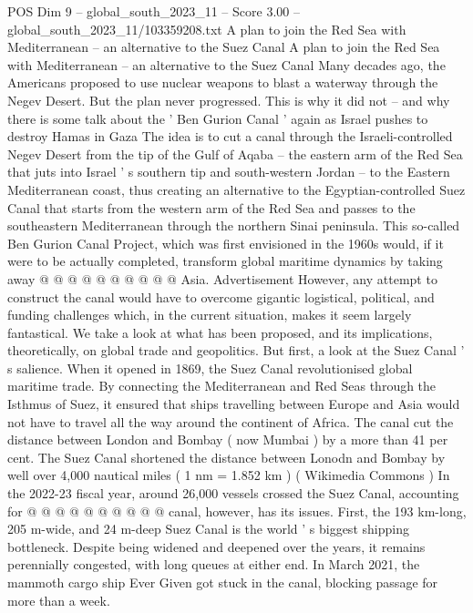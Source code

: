 \begin{textsample}{POS Dim 9 – global\_south\_2023\_11 – Score 3.00 – global\_south\_2023\_11/103359208.txt}  \label{ex:f9_pos_126}
A plan to join the Red Sea with Mediterranean -- an alternative to the Suez Canal A plan to join the Red Sea with Mediterranean -- an alternative to the Suez Canal Many decades ago, the Americans proposed to use nuclear weapons to blast a waterway through the Negev Desert.
But the plan never progressed.
This is why it did not -- and why there is some talk about the ' Ben Gurion Canal ' again as Israel pushes to destroy Hamas in Gaza The idea is to cut a canal through the Israeli-controlled Negev Desert from the tip of the Gulf of Aqaba -- the eastern arm of the Red Sea that juts into Israel ' s southern tip and south-western Jordan -- to the Eastern Mediterranean coast, thus creating an alternative to the Egyptian-controlled Suez Canal that starts from the western arm of the Red Sea and passes to the southeastern Mediterranean through the northern Sinai peninsula.
This so-called Ben Gurion Canal Project, which was first envisioned in the 1960s would, if it were to be actually completed, transform global maritime dynamics by taking away @ @ @ @ @ @ @ @ @ @ Asia.
Advertisement However, any attempt to construct the canal would have to overcome gigantic logistical, political, and funding challenges which, in the current situation, makes it seem largely fantastical.
We take a look at what has been proposed, and its implications, theoretically, on global trade and geopolitics.
But first, a look at the Suez Canal ' s salience.
When it opened in 1869, the Suez Canal revolutionised global maritime trade.
By connecting the Mediterranean and Red Seas through the Isthmus of Suez, it ensured that ships travelling between Europe and Asia would not have to travel all the way around the continent of Africa.
The canal cut the distance between London and Bombay ( now Mumbai ) by a more than 41 per cent.
The Suez Canal shortened the distance between Lonodn and Bombay by well over 4,000 nautical miles ( 1 nm = 1.852 km ) ( Wikimedia Commons ) In the 2022-23 fiscal year, around 26,000 vessels crossed the Suez Canal, accounting for @ @ @ @ @ @ @ @ @ @ canal, however, has its issues.
First, the 193 km-long, 205 m-wide, and 24 m-deep Suez Canal is the world ' s biggest shipping bottleneck.
Despite being widened and deepened over the years, it remains perennially congested, with long queues at either end.
In March 2021, the mammoth cargo ship Ever Given got stuck in the canal, blocking passage for more than a week.

\end{textsample}
